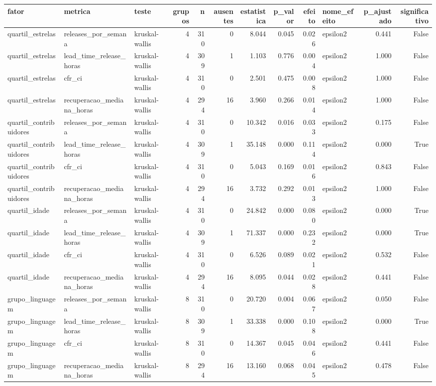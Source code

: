 \begin{tabular}{lllrrrrrrlrr}
\toprule
fator & metrica & teste & grupos & n & ausentes & estatistica & p_valor & efeito & nome_efeito & p_ajustado & significativo \\
\midrule
quartil_estrelas & releases_por_semana & kruskal-wallis & 4 & 310 & 0 & 8.044 & 0.045 & 0.026 & epsilon2 & 0.441 & False \\
quartil_estrelas & lead_time_release_horas & kruskal-wallis & 4 & 309 & 1 & 1.103 & 0.776 & 0.004 & epsilon2 & 1.000 & False \\
quartil_estrelas & cfr_ci & kruskal-wallis & 4 & 310 & 0 & 2.501 & 0.475 & 0.008 & epsilon2 & 1.000 & False \\
quartil_estrelas & recuperacao_mediana_horas & kruskal-wallis & 4 & 294 & 16 & 3.960 & 0.266 & 0.014 & epsilon2 & 1.000 & False \\
quartil_contribuidores & releases_por_semana & kruskal-wallis & 4 & 310 & 0 & 10.342 & 0.016 & 0.033 & epsilon2 & 0.175 & False \\
quartil_contribuidores & lead_time_release_horas & kruskal-wallis & 4 & 309 & 1 & 35.148 & 0.000 & 0.114 & epsilon2 & 0.000 & True \\
quartil_contribuidores & cfr_ci & kruskal-wallis & 4 & 310 & 0 & 5.043 & 0.169 & 0.016 & epsilon2 & 0.843 & False \\
quartil_contribuidores & recuperacao_mediana_horas & kruskal-wallis & 4 & 294 & 16 & 3.732 & 0.292 & 0.013 & epsilon2 & 1.000 & False \\
quartil_idade & releases_por_semana & kruskal-wallis & 4 & 310 & 0 & 24.842 & 0.000 & 0.080 & epsilon2 & 0.000 & True \\
quartil_idade & lead_time_release_horas & kruskal-wallis & 4 & 309 & 1 & 71.337 & 0.000 & 0.232 & epsilon2 & 0.000 & True \\
quartil_idade & cfr_ci & kruskal-wallis & 4 & 310 & 0 & 6.526 & 0.089 & 0.021 & epsilon2 & 0.532 & False \\
quartil_idade & recuperacao_mediana_horas & kruskal-wallis & 4 & 294 & 16 & 8.095 & 0.044 & 0.028 & epsilon2 & 0.441 & False \\
grupo_linguagem & releases_por_semana & kruskal-wallis & 8 & 310 & 0 & 20.720 & 0.004 & 0.067 & epsilon2 & 0.050 & False \\
grupo_linguagem & lead_time_release_horas & kruskal-wallis & 8 & 309 & 1 & 33.338 & 0.000 & 0.108 & epsilon2 & 0.000 & True \\
grupo_linguagem & cfr_ci & kruskal-wallis & 8 & 310 & 0 & 14.367 & 0.045 & 0.046 & epsilon2 & 0.441 & False \\
grupo_linguagem & recuperacao_mediana_horas & kruskal-wallis & 8 & 294 & 16 & 13.160 & 0.068 & 0.045 & epsilon2 & 0.478 & False \\
\bottomrule
\end{tabular}
